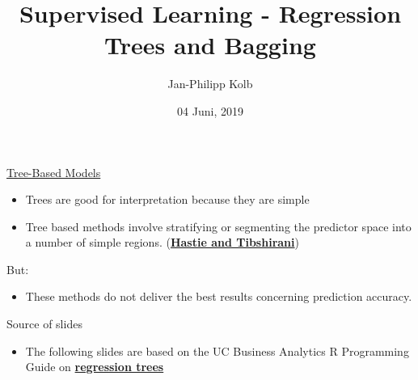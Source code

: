 \documentclass[
  10pt,
  ignorenonframetext,
]{beamer}
\title{Supervised Learning - Regression Trees and Bagging}
\author{Jan-Philipp Kolb}
\date{04 Juni, 2019}
\providecommand{\tightlist}{%
  \setlength{\itemsep}{0pt}\setlength{\parskip}{0pt}}
\begin{document}
\frame{\titlepage}

\begin{frame}{\href{https://www.statmethods.net/advstats/cart.html}{Tree-Based
Models}}
\protect\hypertarget{tree-based-models}{}

\begin{itemize}
\item
  Trees are good for interpretation because they are simple
\item
  Tree based methods involve stratifying or segmenting the predictor
  space into a number of simple regions.
  (\href{https://lagunita.stanford.edu/c4x/HumanitiesScience/StatLearning/asset/trees.pdf}{\textbf{Hastie
  and Tibshirani}})
\end{itemize}

\begin{block}{But:}

\begin{itemize}
\tightlist
\item
  These methods do not deliver the best results concerning prediction
  accuracy.
\end{itemize}

\end{block}

\begin{block}{Source of slides}

\begin{itemize}
\tightlist
\item
  The following slides are based on the UC Business Analytics R
  Programming Guide on
  \href{http://uc-r.github.io/regression_trees}{\textbf{regression
  trees}}
\end{itemize}

\end{block}

\end{frame}
\end{document}

